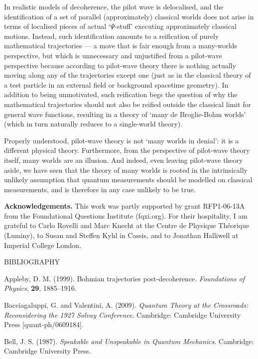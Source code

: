 \documentclass{article}%
\begin{document}
In realistic models of decoherence, the pilot wave is delocalised, and the
identification of a set of parallel (approximately) classical worlds does not
arise in terms of localised pieces of actual `$\Psi$-stuff' executing
approximately classical motions. Instead, such identification amounts to a
reification of purely mathematical trajectories --- a move that is fair enough
from a many-worlds perspective, but which is unnecessary and unjustified from
a pilot-wave perspective because according to pilot-wave theory there is
nothing actually moving along any of the trajectories except one (just as in
the classical theory of a test particle in an external field or background
spacetime geometry). In addition to being unmotivated, such reification begs
the question of why the mathematical trajectories should not also be reified
outside the classical limit for general wave functions, resulting in a theory
of `many de Broglie-Bohm worlds' (which in turn naturally reduces to a
single-world theory).

Properly understood, pilot-wave theory is not `many worlds in denial': it is a
different physical theory. Furthermore, from the perspective of pilot-wave
theory itself, many worlds are an illusion. And indeed, even leaving
pilot-wave theory aside, we have seen that the theory of many worlds is rooted
in the intrinsically unlikely assumption that quantum measurements should be
modelled on classical measurements, and is therefore in any case unlikely to
be true.

\textbf{Acknowledgements.} This work was partly supported by grant RFP1-06-13A
from the Foundational Questions Institute (fqxi.org). For their hospitality, I
am grateful to Carlo Rovelli and Marc Knecht at the Centre de Physique
Th\'{e}orique (Luminy), to Susan and Steffen Kyhl in Cassis, and to Jonathan
Halliwell at Imperial College London.

\begin{center}
BIBLIOGRAPHY
\end{center}

Appleby, D. M. (1999). Bohmian trajectories post-decoherence.
\textit{Foundations of Physics}, \textbf{29}, 1885--1916.

Bacciagaluppi, G. and Valentini, A. (2009). \textit{Quantum Theory at the
Crossroads: Reconsidering the 1927 Solvay Conference}. Cambridge: Cambridge
University Press [quant-ph/0609184].

Bell, J. S. (1987). \textit{Speakable and Unspeakable in Quantum Mechanics}.
Cambridge: Cambridge University Press.
\end{document}
